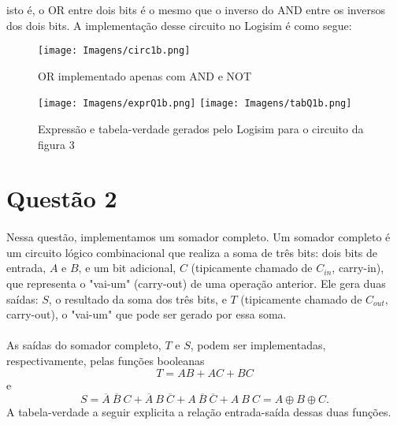 \documentclass[a4paper, 12pt]{article}
\begin{document}
\noindent isto é, o OR entre dois bits é o mesmo que o inverso do AND entre os inversos dos dois bits. A implementação desse circuito no Logisim é como segue:

\begin{figure}[H]
    \centering
    \texttt{[image: Imagens/circ1b.png]}
    \caption{OR implementado apenas com AND e NOT}
\end{figure}

\begin{figure}[H]
    \centering
    \texttt{[image: Imagens/exprQ1b.png]}
    \texttt{[image: Imagens/tabQ1b.png]} \\
    \caption{Expressão e tabela-verdade gerados pelo Logisim para o circuito da figura 3}
\end{figure}

\section{Questão 2}
\paragraph{}
Nessa questão, implementamos um somador completo. Um somador completo é um circuito lógico combinacional que realiza a soma de três bits: dois bits de entrada, $A$ e $B$, e um bit adicional, $C$ (tipicamente chamado de $C_{in}$, carry-in), que representa o "vai-um" (carry-out) de uma operação anterior. Ele gera duas saídas: $S$, o resultado da soma dos três bits, e $T$ (tipicamente chamado de $C_{out}$, carry-out), o "vai-um" que pode ser gerado por essa soma.
\paragraph{}
As saídas do somador completo, $T$ e $S$, podem ser implementadas, respectivamente, pelas funções booleanas
\[T = AB + AC + BC\] e \[S = \overline{A} \ \overline{B} \ C + \overline{A} \ B \ \overline{C} + A \ \overline{B} \ \overline{C} + A \ B \ C = A \oplus B \oplus C.\] A tabela-verdade a seguir explicita a relação entrada-saída dessas duas funções.
\end{document}
